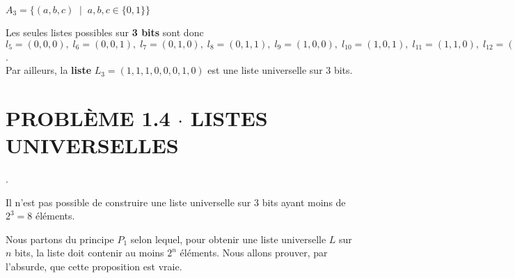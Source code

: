 \documentclass[8pt]{report}
\begin{document}
            \begin{center}
                    $ A_3 = \{ (a,b, c) \;\; | \;\; a, b, c \in \{0, 1\} \}$ \\
            \end{center} 


            \begin{Reponse}{}{}
                Les seules listes possibles sur \textbf{3  bits} sont donc 
                $l_5 = (0,0,0),\; l_6 = (0,0,1),\; l_7 = (0, 1, 0),\; l_8 = (0,1,1),\; l_9 = (1,0,0),\; 
                l_{10} = (1,0,1), \; l_{11} = (1,1,0), \; l_{12} = (1,1,1)$. \\ 
                Par ailleurs, la \textbf{liste} $L_3 = (1, 1, 1, 0, 0, 0, 1, 0)$ est une liste 
                universelle sur 3 bits.  
            \end{Reponse}

\section*{\textnormal{PROBLÈME 1.4 \;\;\;\; $\cdot$ \;\;\;\; LISTES UNIVERSELLES}}.
        \begin{Reponse}{}{}
            Il n'est pas possible de construire une liste universelle sur 3 bits ayant moins de $2^3 = 8$ 
            éléments.
        \end{Reponse}
        Nous partons du principe 
        $P_1$ selon lequel, 
        pour obtenir une liste universelle $L$ sur $n$ bits, la liste doit contenir au moins 
        $2^n$ éléments. Nous allons prouver, par l'absurde, que cette proposition est vraie. \\\\  
\end{document}
